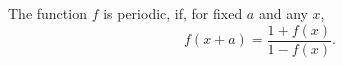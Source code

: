 The function $f$ is periodic, if, for fixed $a$ and any $x$,
\[ f(x + a) = \frac{1 + f(x)}{1 - f(x)}. \]
